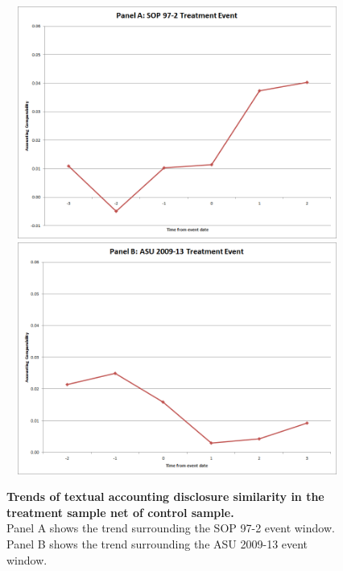 \documentclass[thesis]{thesis-umich}
\begin{document}
\begin{figure}[H] 
\centering
\includegraphics[width=6in, height=3in]{figures/cossim-sop972-trends}
\vspace{10mm}
\includegraphics[width=6in, height=3in]{figures/cossim-asu200913-trends}
\captionsetup{justification=centering, width=.95\textwidth} 
\caption[\textbf{Trends of textual accounting disclosure similarity in the treatment sample net of control sample.}]{\footnotesize \textbf{Trends of textual accounting disclosure similarity in the treatment sample net of control sample.}\\
Panel A shows the trend surrounding the SOP 97-2 event window. Panel B shows the trend surrounding the ASU 2009-13 event window.} \label{cossim-trends}
\end{figure} 
\newpage 
\end{document}
